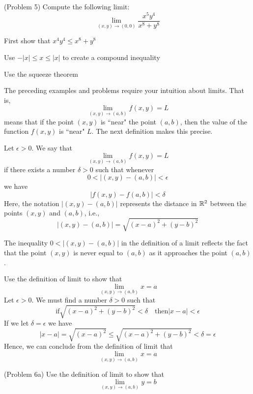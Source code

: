 \documentclass[handout]{ximera}
\begin{document}
\begin{problem}(Problem 5)
Compute the following limit:
\[
\lim_{(x,y) \to (0,0)} \frac{x^5y^4}{x^8 + y^8}
\]
\begin{hint}
First show that $x^4y^4 \leq x^8 + y^8$
\end{hint}
\begin{hint}
Use $-|x| \leq x \leq |x|$ to create a compound inequality
\end{hint}
\begin{hint}
Use the squeeze theorem
\end{hint}
\end{problem}
The preceding examples and problems require your intuition about limits.  That is,
\[
\lim_{(x,y) \to (a,b)} f(x,y) = L
\]
means that if the point $(x,y)$ is ``near" the point $(a,b)$, then the value of the function $f(x, y)$ is ``near" $L$.
The next definition makes this precise.


\begin{definition}[Limit]
Let $\epsilon > 0$. We say that
\[
\lim_{(x,y) \to (a,b)} f(x,y) = L
\]
if there exists a number $\delta >0$ such that whenever
\[
0< \left|(x,y) - (a,b)\right| < \epsilon
\]
we have
\[
\left|f(x,y) - f(a,b)\right| < \delta
\]
Here, the notation $|(x,y) - (a,b)|$ represents the distance in $\mathbb R^2$ between the points $(x,y)$ and $(a,b)$, i.e.,
\[
|(x,y) - (a,b)| = \sqrt{(x-a)^2 + (y-b)^2}
\]
\end{definition}

\begin{remark}
The inequality $0< |(x,y) - (a,b)|$ in the definition of a limit reflects the fact that the point $(x,y)$ is never equal to $(a,b)$
as it approaches the point $(a,b)$.
\end{remark}

\begin{example}[Example 6]
Use the definition of limit to show that 
\[
\lim_{(x,y) \to (a,b)} x = a
\]
Let $\epsilon >0$.  We must find a number $\delta >0$ such that
\[
\text{if} \sqrt{(x-a)^2 + (y-b)^2} < \delta \quad \text{then} |x-a| < \epsilon
\]
If we let $\delta = \epsilon$ we have
\[
|x-a| = \sqrt{(x-a)^2} \leq \sqrt{(x-a)^2 + (y-b)^2} < \delta = \epsilon
\]
Hence, we can conclude from the definition of limit that
\[
\lim_{(x,y) \to (a,b)} x = a
\]
\end{example}

\begin{problem}(Problem 6a)
Use the definition of limit to show that 
\[
\lim_{(x,y) \to (a,b)} y = b
\]
\end{problem}
\end{document}
